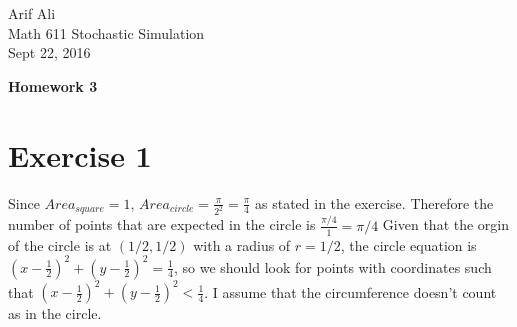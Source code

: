 \documentclass{article}\usepackage[]{graphicx}\usepackage[]{color}
\begin{document}
\begin{flushright}
Arif Ali\\
Math 611 Stochastic Simulation\\
Sept 22, 2016\\
\end{flushright}

\begin{center}
\LARGE\textbf{Homework 3}
  \end{center}
\section*{Exercise 1}
Since $Area_{square}=1$, $Area_{circle}=\frac{\pi}{2^2}=\frac{\pi}{4}$ as stated in the exercise. Therefore the number of points that are expected in the circle is $\frac{\pi/4}{1}= \pi/4$ Given that the orgin of the circle is at $(1/2,1/2)$ with a radius of $r=1/2$, the circle equation is $(x-\frac{1}{2})^2+(y-\frac{1}{2})^2=\frac{1}{4}$, so we should look for points with coordinates such that $(x-\frac{1}{2})^2+(y-\frac{1}{2})^2<\frac{1}{4}$. I assume that the circumference doesn't count as in the circle.
\end{document}
